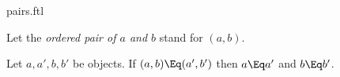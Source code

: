 \documentclass{stex}
\begin{document}
\begin{smodule}{pairs.ftl}


\begin{convention*}[forthel]
  Let the \emph{ordered pair of $a$ and $b$} stand for $(a,b)$.
\end{convention*}

\begin{axiom*}[forthel,title=Ordered Pair Extensionality]
  Let $a,a',b,b'$ be objects.
  If $(a, b) \Eq (a', b')$ then $a \Eq a'$ and $b \Eq b'$.
\end{axiom*}

\end{smodule}
\end{document}
